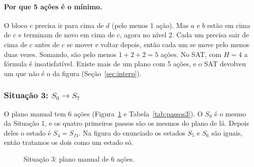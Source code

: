 \documentclass[11pt,a4paper]{article}
\newcommand{\mesa}{%
  \draw[line width=0.7pt] (0,0) -- (3,0);
  \foreach \i in {0,...,6}{\draw (\i*0.5,0) -- (\i*0.5,-0.07);
    \node[below,inner sep=1pt,font=\tiny] at (\i*0.5,-0.07) {\i};}}
\newcommand{\bl}[4]{%
  \filldraw[fill=cor#4,draw=black!70] (#1*0.5,#2*0.5) rectangle ++(#3*0.5,0.5);
  \node[font=\small] at (#1*0.5+#3*0.25,#2*0.5+0.25) {\textit{#4}};}
\newcommand{\rot}[1]{\node[font=\small] at (1.5,1.35) {#1};}
\newcommand{\Szero}{\bl{0}{0}{2}{c}\bl{3}{0}{1}{a}\bl{5}{0}{1}{b}\bl{3}{1}{3}{d}}
\newcommand{\Sum}{\bl{0}{0}{2}{c}\bl{3}{0}{1}{a}\bl{5}{0}{1}{b}\bl{0}{1}{3}{d}}
\newcommand{\Sdois}{\bl{0}{0}{2}{c}\bl{0}{1}{3}{d}\bl{5}{0}{1}{b}\bl{5}{1}{1}{a}}
\newcommand{\Stres}{\bl{0}{0}{2}{c}\bl{2}{0}{3}{d}\bl{5}{0}{1}{b}\bl{5}{1}{1}{a}}
\newcommand{\Sfq}{\bl{0}{0}{2}{c}\bl{2}{0}{3}{d}\bl{5}{0}{1}{b}\bl{0}{1}{1}{a}}
\newcommand{\Ucinco}{\bl{0}{0}{2}{c}\bl{2}{0}{3}{d}\bl{0}{1}{1}{a}\bl{1}{1}{1}{b}}
\newcommand{\Usete}{\bl{0}{0}{2}{c}\bl{3}{0}{3}{d}\bl{0}{1}{1}{a}\bl{1}{1}{1}{b}}
\begin{document}
\paragraph{Por que 5 ações é o mínimo.} O bloco $c$ precisa ir para cima de $d$
(pelo menos 1 ação). Mas $a$ e $b$ estão em cima de $c$ e terminam de novo em cima
de $c$, agora no nível 2. Cada um precisa sair de cima de $c$ antes de $c$ se mover
e voltar depois, então cada um se move pelo menos duas vezes. Somando, são pelo menos
$1+2+2=5$ ações. No SAT, com $H=4$ a fórmula é insatisfatível. Existe mais de um
plano com 5 ações, e o SAT devolveu um que não é o da figura
(Seção~\ref{sec:interp}).

\subsubsection{Situação 3: \texorpdfstring{$S_0 \to S_7$}{S0 -> S7}}
\label{sec:manual3}
O plano manual tem 6 ações (Figura~\ref{fig:plano3} e Tabela~\ref{tab:passos3}). O
$S_0$ é o mesmo da Situação 1, e os quatro primeiros passos são os mesmos do plano
de lá. Depois deles o estado é $S_4=S_{f4}$. Na figura do enunciado os estados $S_5$
e $S_6$ são iguais, então tratamos os dois como um estado só.

\begin{figure}[H]
\centering
{}
\caption{Situação 3: plano manual de 6 ações.}
\label{fig:plano3}
\end{figure}
\end{document}
